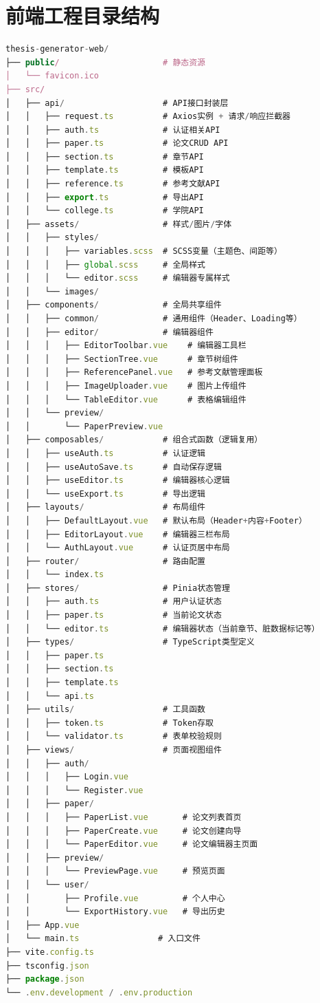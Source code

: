 \documentclass{../softeng}
\begin{document}
\section{前端工程目录结构}

\begin{lstlisting}[language=JavaScript]
thesis-generator-web/
├── public/                     # 静态资源
│   └── favicon.ico
├── src/
│   ├── api/                    # API接口封装层
│   │   ├── request.ts          # Axios实例 + 请求/响应拦截器
│   │   ├── auth.ts             # 认证相关API
│   │   ├── paper.ts            # 论文CRUD API
│   │   ├── section.ts          # 章节API
│   │   ├── template.ts         # 模板API
│   │   ├── reference.ts        # 参考文献API
│   │   ├── export.ts           # 导出API
│   │   └── college.ts          # 学院API
│   ├── assets/                 # 样式/图片/字体
│   │   ├── styles/
│   │   │   ├── variables.scss  # SCSS变量（主题色、间距等）
│   │   │   ├── global.scss     # 全局样式
│   │   │   └── editor.scss     # 编辑器专属样式
│   │   └── images/
│   ├── components/             # 全局共享组件
│   │   ├── common/             # 通用组件（Header、Loading等）
│   │   ├── editor/             # 编辑器组件
│   │   │   ├── EditorToolbar.vue    # 编辑器工具栏
│   │   │   ├── SectionTree.vue      # 章节树组件
│   │   │   ├── ReferencePanel.vue   # 参考文献管理面板
│   │   │   ├── ImageUploader.vue    # 图片上传组件
│   │   │   └── TableEditor.vue      # 表格编辑组件
│   │   └── preview/
│   │       └── PaperPreview.vue
│   ├── composables/            # 组合式函数（逻辑复用）
│   │   ├── useAuth.ts          # 认证逻辑
│   │   ├── useAutoSave.ts      # 自动保存逻辑
│   │   ├── useEditor.ts        # 编辑器核心逻辑
│   │   └── useExport.ts        # 导出逻辑
│   ├── layouts/                # 布局组件
│   │   ├── DefaultLayout.vue   # 默认布局（Header+内容+Footer）
│   │   ├── EditorLayout.vue    # 编辑器三栏布局
│   │   └── AuthLayout.vue      # 认证页居中布局
│   ├── router/                 # 路由配置
│   │   └── index.ts
│   ├── stores/                 # Pinia状态管理
│   │   ├── auth.ts             # 用户认证状态
│   │   ├── paper.ts            # 当前论文状态
│   │   └── editor.ts           # 编辑器状态（当前章节、脏数据标记等）
│   ├── types/                  # TypeScript类型定义
│   │   ├── paper.ts
│   │   ├── section.ts
│   │   ├── template.ts
│   │   └── api.ts
│   ├── utils/                  # 工具函数
│   │   ├── token.ts            # Token存取
│   │   └── validator.ts        # 表单校验规则
│   ├── views/                  # 页面视图组件
│   │   ├── auth/
│   │   │   ├── Login.vue
│   │   │   └── Register.vue
│   │   ├── paper/
│   │   │   ├── PaperList.vue       # 论文列表首页
│   │   │   ├── PaperCreate.vue     # 论文创建向导
│   │   │   └── PaperEditor.vue     # 论文编辑器主页面
│   │   ├── preview/
│   │   │   └── PreviewPage.vue     # 预览页面
│   │   └── user/
│   │       ├── Profile.vue         # 个人中心
│   │       └── ExportHistory.vue   # 导出历史
│   ├── App.vue
│   └── main.ts                # 入口文件
├── vite.config.ts
├── tsconfig.json
├── package.json
└── .env.development / .env.production
\end{lstlisting}
\end{document}
